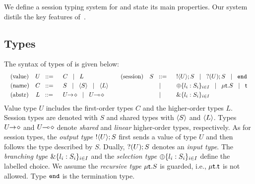 \noi %
We define a session typing system for \HOp and state its main properties. 
Our system distils the key features of~\cite{tlca07,MostrousY15}.



\subsection{Types}
The syntax of types of \HOp is given below:
\[
	\begin{array}{cc}
		\begin{array}{lcl}
			\textrm{(value)} & U \;\;::=\;\; & C \;\;\;|\;\;\; L
			\\[1mm]
			\textrm{(name)} & C \;\;::=\;\; & S \;\;\;|\;\;\; \langle S \rangle \;\;\;|\;\;\; \langle L \rangle
			\\[1mm]
			\textrm{(abstr)} & L \;\;::=\;\; & U\!\! \rightarrow\! \diamond \;\;\;|\;\;\; U\!\! \multimap\! \diamond
		\end{array}
		&
		\begin{array}{lcl}
			\textrm{(session)} & S \;\;::=\;\; &  ! \langle U \rangle ; S \;\;\;|\;\;\; ? (U) ; S \;\;\;|\;\;\; \mathtt{end}
			\\[1mm]
			&\;\;\;|\;\;\;& \oplus \{l_i:S_i\}_{i \in I} \;\;\;|\;\;\; \mu\mathsf{t}.S \;\;\;|\;\;\; \mathsf{t}
			\\[1mm]
			&\;\;\;|\;\;\;& \& \{l_i:S_i\}_{i \in I}
		\end{array}
	\end{array}
	\]
Value type $U$ includes
the first-order types $C$ and the higher-order
types $L$. Session types are denoted with $S$ and
shared types with $\langle S \rangle$ and $\langle L \rangle$.
Types $U\!\! \rightarrow\! \diamond$ and $U\!\! \multimap\! \diamond$ denote
{\em shared} and {\em linear} higher-order 
types, respectively.
As for session types,  
the {\em output type}
$! \langle U \rangle ; S$ %
first sends a value of
type $U$ and then follows the type described by $S$.  Dually,
$? (U) ; S$ denotes an {\em input type}. The {\em branching type}
$\& \{l_i:S_i\}_{i \in I}$ and the {\em selection type}
$\oplus \{l_i:S_i\}_{i \in I}$ define the labelled choice. 
We assume the {\em recursive type} $\mu\mathsf{t}.S$ is guarded,
i.e.,  $\mu\mathsf{t}.\mathsf{t}$ is not allowed. 
Type $\mathtt{end}$ is the termination type. 

